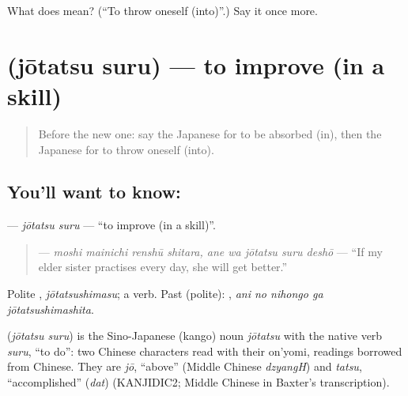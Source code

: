 \begin{tcolorbox}[breakable,colback=teal!4,colframe=teal!35!black,title={Before you move on}]
What does  mean? (\textquotedblleft{}To throw oneself (into)\textquotedblright{}.) Say it once more.
\end{tcolorbox}
\section[\texorpdfstring{\ja{じょうたつする} (jōtatsu suru)}{じょうたつする (jōtatsu suru)}]{ (jōtatsu suru) — to improve (in a skill)}

\label{lesson:JA-C533-joutatsu-suru}



\begin{quote}
Before the new one: say the Japanese for to be absorbed (in), then the Japanese for to throw oneself (into).
\end{quote}

\subsection*{You'll want to know: }
\textbf{} — \emph{jōtatsu suru} — \textquotedblleft{}to improve (in a skill)\textquotedblright{}.

\begin{quote}
\textbf{   } — \emph{moshi mainichi renshū shitara, ane wa jōtatsu suru deshō} — \textquotedblleft{}If my elder sister practises every day, she will get better.\textquotedblright{}
\end{quote}

Polite \textbf{}, \emph{jōtatsushimasu}; a  verb. Past (polite): \textbf{  }, \emph{ani no nihongo ga jōtatsushimashita}.

\begin{cousinweb}
\textbf{} (\emph{jōtatsu suru}) is the Sino-Japanese (kango) noun \emph{jōtatsu} with the native verb \emph{suru}, \textquotedblleft{}to do\textquotedblright{}: two Chinese characters read with their on'yomi, readings borrowed from Chinese. They are \emph{jō}, \textquotedblleft{}above\textquotedblright{} (Middle Chinese \emph{dzyangH}) and \emph{tatsu}, \textquotedblleft{}accomplished\textquotedblright{} (\emph{dat}) (KANJIDIC2; Middle Chinese in Baxter's transcription).
\end{cousinweb}

